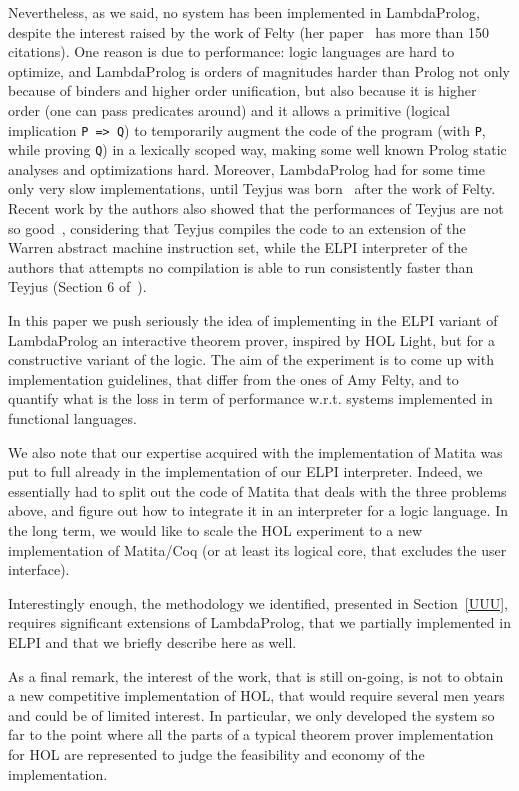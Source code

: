 \documentclass[preprint]{sigplanconf}
\begin{document}
Nevertheless, as we said, no system has been implemented in LambdaProlog, despite the interest raised by the work of Felty (her paper~\cite{amy4} has more than 150 citations). One reason is due to performance: logic languages are hard to optimize, and LambdaProlog is orders of magnitudes harder than Prolog not only because of binders and higher order unification, but also because it is higher order (one can pass predicates around) and it allows a primitive (logical implication \texttt{P => Q}) to temporarily augment the code of the program (with \texttt{P}, while proving \texttt{Q}) in a lexically scoped way, making some well known Prolog static analyses and optimizations hard. Moreover, LambdaProlog had for some time only very slow implementations, until Teyjus was born~\cite{teyjus1} after the work of Felty. Recent work by the authors also showed that the performances of Teyjus are not so good~\cite{elpi1}, considering that Teyjus compiles the code to an extension of the Warren abstract machine instruction set, while the ELPI interpreter of the authors that attempts no compilation is able to run consistently faster than Teyjus (Section 6 of~\cite{elpi1}).

In this paper we push seriously the idea of implementing in the ELPI variant of LambdaProlog an interactive theorem prover, inspired by HOL Light, but for a constructive variant of the logic. The aim of the experiment is to come up with implementation guidelines, that differ from the ones of Amy Felty, and to quantify what is the loss in term of performance w.r.t. systems implemented in functional languages.

We also note that our expertise acquired with the implementation of Matita was put to full already in the implementation of our ELPI interpreter. Indeed, we essentially had to split out the code of Matita that deals with the three problems above, and figure out how to integrate it in an interpreter for a logic language. In the long term, we would like to scale the HOL experiment to a new implementation of Matita/Coq (or at least its logical core, that excludes the user interface).

Interestingly enough, the methodology we identified, presented in Section~\ref{UUU}, requires significant extensions of LambdaProlog, that we partially implemented in ELPI and that we briefly describe here as well.

As a final remark, the interest of the work, that is still on-going, is not to obtain a new competitive implementation of HOL, that would require several men years and could be of limited interest. In particular, we only developed the system so far to the point where all the parts of a typical theorem prover implementation for HOL are represented to judge the feasibility and economy of the implementation.
\end{document}
